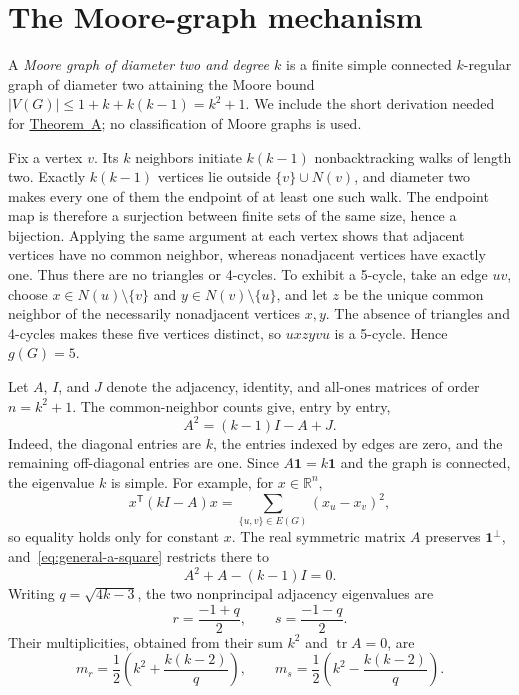 \documentclass[a4paper,11pt,reqno]{amsart}
\theoremstyle{plain}
\theoremstyle{definition}
\theoremstyle{remark}
\newcommand{\one}{\mathbf 1}
\newcommand{\tr}{\operatorname{tr}}
\begin{document}
\section{The Moore-graph mechanism}\label{sec:moore}

A \emph{Moore graph of diameter two and degree \(k\)} is a finite simple
connected \(k\)-regular graph of diameter two attaining the Moore bound
\(|V(G)|\le 1+k+k(k-1)=k^2+1\).  We include the short derivation needed for
\hyperref[thm:moore-wow]{Theorem~A}; no classification of Moore graphs is used.

Fix a vertex \(v\).  Its \(k\) neighbors initiate \(k(k-1)\) nonbacktracking
walks of length two.  Exactly \(k(k-1)\) vertices lie outside
\(\{v\}\cup N(v)\), and diameter two makes every one of them the endpoint of
at least one such walk.  The endpoint map is therefore a surjection between
finite sets of the same size, hence a bijection.  Applying the same argument
at each vertex shows that adjacent vertices have no common neighbor, whereas
nonadjacent vertices have exactly one.  Thus there are no triangles or
4-cycles.  To exhibit a 5-cycle, take an edge \(uv\), choose
\(x\in N(u)\setminus\{v\}\) and \(y\in N(v)\setminus\{u\}\), and let \(z\)
be the unique common neighbor of the necessarily nonadjacent vertices
\(x,y\).  The absence of triangles and 4-cycles makes these five vertices
distinct, so \(uxzyvu\) is a 5-cycle.  Hence \(g(G)=5\).

Let \(A\), \(I\), and \(J\) denote the adjacency, identity, and all-ones
matrices of order \(n=k^2+1\).  The common-neighbor counts give, entry by
entry,
\begin{equation}\label{eq:general-a-square}
 A^2=(k-1)I-A+J.
\end{equation}
Indeed, the diagonal entries are \(k\), the entries indexed by edges are
zero, and the remaining off-diagonal entries are one.  Since
\(A\one=k\one\) and the graph is connected, the eigenvalue \(k\) is simple.
For example, for \(x\in\mathbb R^n\),
\[
 x^{\mathsf T}(kI-A)x
   =\sum_{\{u,v\}\in E(G)}(x_u-x_v)^2,
\]
so equality holds only for constant \(x\).  The real symmetric matrix \(A\)
preserves \(\one^\perp\), and~\eqref{eq:general-a-square} restricts there to
\[
 A^2+A-(k-1)I=0.
\]
Writing \(q=\sqrt{4k-3}\), the two nonprincipal adjacency eigenvalues are
\[
 r=\frac{-1+q}{2},\qquad s=\frac{-1-q}{2}.
\]
Their multiplicities, obtained from their sum \(k^2\) and \(\tr A=0\), are
\begin{equation}\label{eq:general-multiplicities}
 m_r=\frac12\left(k^2+\frac{k(k-2)}q\right),\qquad
 m_s=\frac12\left(k^2-\frac{k(k-2)}q\right).
\end{equation}
\end{document}
